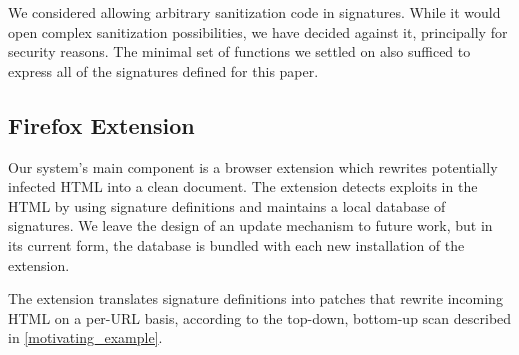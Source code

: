 We considered allowing arbitrary sanitization code in
signatures. While it would open complex sanitization possibilities, we
have decided against it, principally for security reasons. The minimal
set of functions we settled on also sufficed to express all of the
signatures defined for this paper.


 \subsection{Firefox Extension} \label{firefox_extension}

 Our system's main component is a browser extension which rewrites
 potentially infected HTML into a clean document.
 The extension detects exploits in the HTML by using signature definitions and
 maintains a local database of signatures. We leave the design of an
 update mechanism to future work, but in its current form, the
 database is bundled with each new installation of the extension.

 The extension translates signature definitions into patches that
 rewrite incoming HTML on a per-URL basis, according to the top-down,
 bottom-up scan described in \autoref{motivating_example}.
 
